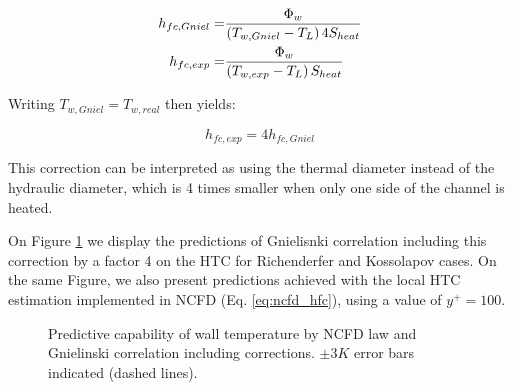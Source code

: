 \begin{align}
h_{fc,Gniel} =& \frac{\Phi_{w}}{\left( T_{w,Gniel}-T_{L} \right) 4S_{heat}} \\
h_{fc,exp} =& \frac{\Phi_{w}}{\left( T_{w,exp}-T_{L} \right) S_{heat}}
\end{align}

Writing $T_{w,Gniel}=T_{w,real}$ then yields:

\begin{equation}
h_{fc,exp}=4h_{fc,Gniel}
\end{equation}

\begin{remark*}{}
This correction can be interpreted as using the thermal diameter instead of the hydraulic diameter, which is 4 times smaller when only one side of the channel is heated.
\end{remark*}

\npar
On Figure \ref{fig:ncfd_gniel_corr_htc} we display the predictions of Gnielisnki correlation including this correction by a factor 4 on the HTC for Richenderfer and Kossolapov cases. On the same Figure, we also present predictions achieved with the local HTC estimation implemented in NCFD (Eq. \ref{eq:ncfd_hfc}), using a value of $y^{+}=100$. 


\begin{figure}[h!]
\centering
{} 
\caption{Predictive capability of wall temperature by NCFD law and Gnielinski correlation including corrections. $\pm 3K$ error bars indicated (dashed lines).}
\label{fig:ncfd_gniel_corr_htc}
\end{figure}

